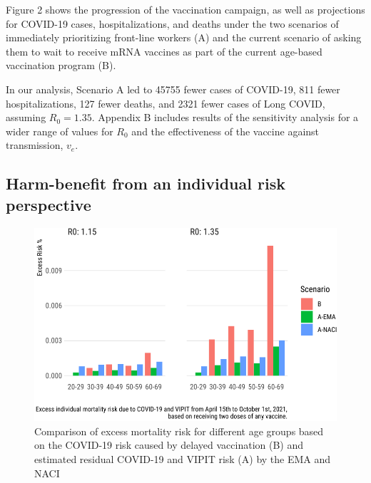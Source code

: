 \documentclass[]{elsarticle} %
\begin{document}
Figure 2 shows the progression of the vaccination campaign, as well as
projections for COVID-19 cases, hospitalizations, and deaths under the
two scenarios of immediately prioritizing front-line workers (A) and the
current scenario of asking them to wait to receive mRNA vaccines as part
of the current age-based vaccination program (B).

In our analysis, Scenario A led to 45755 fewer cases of COVID-19, 811
fewer hospitalizations, 127 fewer deaths, and 2321 fewer cases of Long
COVID, assuming \(R_0=1.35\). Appendix B includes results of the
sensitivity analysis for a wider range of values for \(R_0\) and the
effectiveness of the vaccine against transmission, \(v_e\).

\hypertarget{harm-benefit-from-an-individual-risk-perspective}{%
\subsection{Harm-benefit from an individual risk
perspective}\label{harm-benefit-from-an-individual-risk-perspective}}

\begin{figure}

{\centering \includegraphics[width=0.9\linewidth]{CMAJOPen_files/figure-latex/covidvsvipit-1} 

}

\caption{ Comparison of excess mortality risk for different age groups based on the COVID-19 risk caused by delayed vaccination (B) and estimated residual COVID-19 and VIPIT risk (A) by the EMA and NACI}\label{fig:covidvsvipit}
\end{figure}
\end{document}
